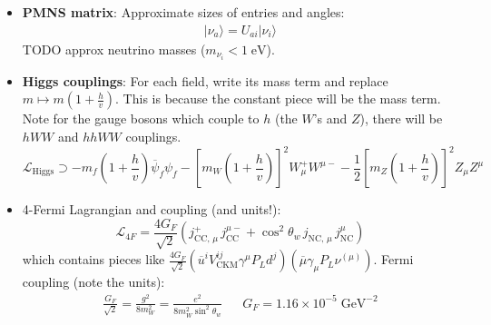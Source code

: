 \documentclass[11pt, oneside]{article}   	%
\theoremstyle{definition}
\numberwithin{equation}{subsection}		%
\begin{document}
\begin{itemize}
	\item \textbf{PMNS matrix}: Approximate sizes of entries and angles:
	\begin{align}
		|\nu_a\rangle = U_{ai} |\nu_i\rangle
	\end{align}
	TODO approx neutrino masses ($m_{\nu_i} < 1\;\mathrm{eV}$). 
	
	\item \textbf{Higgs couplings}: For each field, write its mass term and replace $m\mapsto m(1 + \frac{h}{v})$. This is because the constant piece will be the mass term. 
	Note for the gauge bosons which couple to $h$ (the $W$'s and $Z$), there will be $h W W$ and $h h W W$ couplings. 
	\begin{equation}
		\mathcal L_\mathrm{Higgs}\supset -m_f\left(1 + \frac{h}{v}\right)\overline\psi_f\psi_f - \left[m_W \left(1 + \frac{h}{v}\right)\right]^2 W_\mu^+ W^{\mu -} - \frac{1}{2} \left[m_Z\left(1 + 
		\frac{h}{v}\right)\right]^2 Z_\mu Z^\mu
	\end{equation}
	
	\item 4-Fermi Lagrangian and coupling (and units!):
	\begin{equation}
		\mathcal L_{4F} = \frac{4 G_F}{\sqrt 2} \left(j_{\mathrm{CC},\,\mu}^+ \, j_\mathrm{CC}^{\mu -} + \cos^2\theta_w \, j_{\mathrm{NC},\,\mu}\,j_\mathrm{NC}^\mu\right)
	\end{equation}
	which contains pieces like $\frac{4 G_F}{\sqrt 2} (\overline u^i V_{\mathrm{CKM}}^{ij} \gamma^\mu P_L d^j) (\overline\mu \gamma_\mu P_L \nu^{(\mu)})$. Fermi coupling (note the 
	units):
	\begin{align}
		\frac{G_F}{\sqrt 2} = \frac{g^2}{8m_W^2} = \frac{e^2}{8 m_W^2\sin^2\theta_w} && G_F = 1.16\times 10^{-5}\;\mathrm{GeV}^{-2}
	\end{align}
	

\end{itemize}
\end{document}
